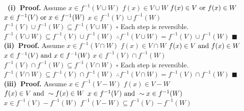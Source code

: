 \documentclass[12pt]{article}
\begin{document}
	\(\ \) \newline
	\textbf{(i)\ Proof.}
	Assume \(x \in f^{-1}(V \cup W)\)
	\newline
	\(f(x) \in V \cup W\)
	\newline
	\(f(x) \in V \textup{ or } f(x) \in W\)
	\newline
	\(x \in f^{-1}(V) \textup{ or } x \in f^{-1}(W)\)
	\newline
	\(x \in f^{-1}(V) \cup f^{-1}(W)\)
	\newline
	\(f^{-1}(V) \cup f^{-1}(W) \subseteq f^{-1}(V \cup W)\)
	\newline \(\square\) \newline
	Each step is reversible.
	\newline
	\(f^{-1}(V \cup W)\subseteq f^{-1}(V) \cup f^{-1}(W)\)
	\newline
	\(\therefore f^{-1}(V\cup W)=f^{-1}(V)\cup f^{-1}(W)\)
	\newline \(\blacksquare\) \newline
	\newline
	\textbf{(ii)\ Proof.}
	Assume \(x \in f^{-1}(V \cap W)\)
	\newline
	\(f(x) \in V \cap W\)
	\newline
	\(f(x) \in V \textup{ and } f(x) \in W\)
	\newline
	\(x \in f^{-1}(V) \textup{ and } x \in f^{-1}(W)\)
	\newline
	\(x \in f^{-1}(V) \cap f^{-1}(W)\)
	\newline
	\(f^{-1}(V) \cap f^{-1}(W) \subseteq f^{-1}(V \cap W)\)
	\newline \(\square\) \newline
	Each step is reversible.
	\newline
	\(f^{-1}(V \cap W)\subseteq f^{-1}(V) \cap f^{-1}(W)\)
	\newline
	\(\therefore f^{-1}(V\cap W)=f^{-1}(V)\cap f^{-1}(W)\)
	\newline \(\blacksquare\) \newline
	\newline
	\textbf{(iii)\ Proof.}
	Assume \(x \in f^{-1}(V-W)\)
	\newline
	\(f(x) \in V-W\)
	\newline
	\(f(x) \in V \textup{ and }\sim f(x) \in W\)
	\newline
	\(x \in f^{-1}(V) \textup{ and }\sim x \in f^{-1}(W)\)
	\newline
	\(x \in f^{-1}(V) - f^{-1}(W)\)
	\newline
	\(f^{-1}(V-W) \subseteq f^{-1}(V) - f^{-1}(W)\)
\end{document}
